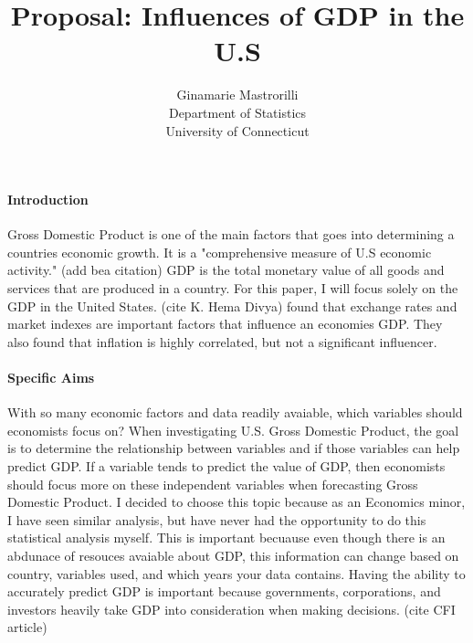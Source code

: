 \documentclass[12pt]{article}
\title{Proposal: Influences of GDP in the U.S }
\author{Ginamarie Mastrorilli\\
  Department of Statistics\\
  University of Connecticut
}
\begin{document}
\maketitle


\paragraph{Introduction}
Gross Domestic Product is one of the main factors that goes into determining a countries economic growth. 
It is a "comprehensive measure of U.S economic activity." (add bea citation) 
GDP is the total monetary value of all goods and services that are produced in a country. For this paper, I will focus solely on the GDP in the United States. 
(cite K. Hema Divya) found that exchange rates and market indexes are important factors that influence an economies GDP. They also found that inflation is highly correlated, but not a significant influencer.  

\paragraph{Specific Aims}
With so many economic factors and data readily avaiable, which variables should economists focus on?
When investigating U.S. Gross Domestic Product, the goal is to determine the relationship between variables and if those variables can help predict GDP.
If a variable tends to predict the value of GDP, then economists should focus more on these independent variables when forecasting Gross Domestic Product.
I decided to choose this topic because as an Economics minor, I have seen similar analysis, but have never had the opportunity to do this statistical analysis myself. 
This is important becuause even though there is an abdunace of resouces avaiable about GDP, this information can change based on country, variables used, and which years your data contains. 
Having the ability to accurately predict GDP is important because governments, corporations, and investors heavily take GDP into consideration when making decisions. (cite CFI article)
\end{document}
